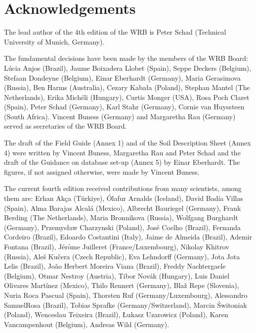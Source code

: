\documentclass[
  letterpaper,
  DIV=11,
  numbers=noendperiod]{scrreprt}
\begin{document}

\hypertarget{acknowledgements}{%
\chapter{Acknowledgements}\label{acknowledgements}}

The lead author of the 4th edition of the WRB is Peter Schad (Technical
University of Munich, Germany).

The fundamental decisions have been made by the members of the WRB
Board: Lúcia Anjos (Brazil), Jaume Boixadera Llobet (Spain), Seppe
Deckers (Belgium), Stefaan Dondeyne (Belgium), Einar Eberhardt
(Germany), Maria Gerasimova (Russia), Ben Harms (Australia), Cezary
Kabała (Poland), Stephan Mantel (The Netherlands), Erika Michéli
(Hungary), Curtis Monger (USA), Rosa Poch Claret (Spain), Peter Schad
(Germany), Karl Stahr (Germany), Cornie van Huyssteen (South Africa).
Vincent Buness (Germany) and Margaretha Rau (Germany) served as
secretaries of the WRB Board.

The draft of the Field Guide (Annex 1) and of the Soil Description Sheet
(Annex 4) were written by Vincent Buness, Margaretha Rau and Peter Schad
and the draft of the Guidance on database set-up (Annex 5) by Einar
Eberhardt. The figures, if not assigned otherwise, were made by Vincent
Buness.

The current fourth edition received contributions from many scientists,
among them are: Erhan Akça (Türkiye), Ólafur Arnalds (Iceland), David
Badía Villas (Spain), Alma Barajas Alcalá (Mexico), Albrecht Bauriegel
(Germany), Frank Berding (The Netherlands), Maria Bronnikova (Russia),
Wolfgang Burghardt (Germany), Przemysław Charzynski (Poland), José
Coelho (Brazil), Fernanda Cordeiro (Brazil), Edoardo Costantini (Italy),
Jaime de Almeida (Brazil), Ademir Fontana (Brazil), Jérȏme Juilleret
(France/Luxembourg), Nikolay Khitrov (Russia), Aleš Kučera (Czech
Republic), Eva Lehndorff (Germany), Jota Jota Lelis (Brazil), João
Herbert Moreira Viana (Brazil), Freddy Nachtergaele (Belgium), Otmar
Nestroy (Austria), Tibor Novák (Hungary), Luis Daniel Olivares Martínez
(Mexico), Thilo Rennert (Germany), Blaž Repe (Slovenia), Nuria Roca
Pascual (Spain), Thorsten Ruf (Germany/Luxembourg), Alessandro
SamuelRosa (Brazil), Tobias Sprafke (Germany/Switzerland), Marcin
Świtoniak (Poland), Wenceslau Teixeira (Brazil), Łukasz Uzarowicz
(Poland), Karen Vancampenhout (Belgium), Andreas Wild (Germany).

\end{document}
